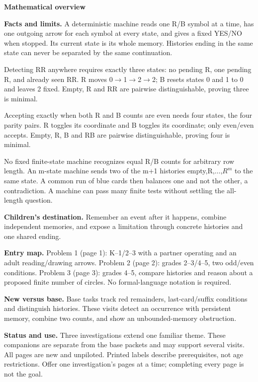 \documentclass[11pt]{article}
\begin{document}
{\Large\bfseries Mathematical overview}\par\medskip
\textbf{Facts and limits.} A deterministic machine reads one R/B symbol at a time, has one outgoing arrow for each symbol at every state, and gives a fixed YES/NO when stopped. Its current state is its whole memory. Histories ending in the same state can never be separated by the same continuation.

Detecting RR anywhere requires exactly three states: no pending R, one pending R, and already seen RR. R moves 0\(\to\)1\(\to\)2\(\to\)2; B resets states 0 and 1 to 0 and leaves 2 fixed. Empty, R and RR are pairwise distinguishable, proving three is minimal.

Accepting exactly when both R and B counts are even needs four states, the four parity pairs. R toggles its coordinate and B toggles its coordinate; only even/even accepts. Empty, R, B and RB are pairwise distinguishable, proving four is minimal.

No fixed finite-state machine recognizes equal R/B counts for arbitrary row length. An m-state machine sends two of the m+1 histories empty,R,\(\ldots\),\(R^m\) to the same state. A common run of blue cards then balances one and not the other, a contradiction. A machine can pass many finite tests without settling the all-length question.

\textbf{Children's destination.} Remember an event after it happens, combine independent memories, and expose a limitation through concrete histories and one shared ending.

\textbf{Entry map.} Problem 1 (page 1): K--1/2--3 with a partner operating and an adult reading/drawing arrows. Problem 2 (page 2): grades 2--3/4--5, two odd/even conditions. Problem 3 (page 3): grades 4--5, compare histories and reason about a proposed finite number of circles. No formal-language notation is required.

\textbf{New versus base.} Base tasks track red remainders, last-card/suffix conditions and distinguish histories. These visits detect an occurrence with persistent memory, combine two counts, and show an unbounded-memory obstruction.
\par\medskip
\textbf{Status and use.} Three investigations extend one familiar theme. These companions are separate from the base packets and may support several visits. All pages are new and unpiloted. Printed labels describe prerequisites, not age restrictions. Offer one investigation’s pages at a time; completing every page is not the goal.
\end{document}
